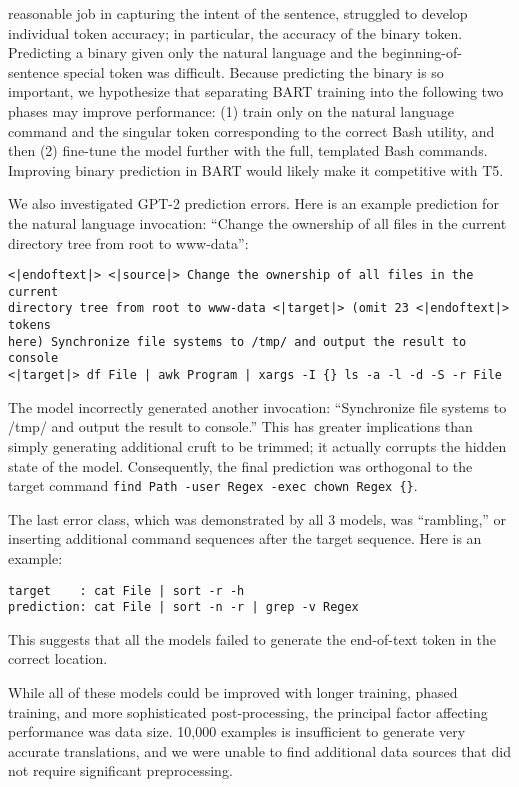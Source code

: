 reasonable job in capturing the intent of the sentence, struggled to develop
individual token accuracy; in particular, the accuracy of the binary token.
Predicting a binary given only the natural language and the
beginning-of-sentence special token was difficult. Because predicting the
binary is so important, we hypothesize that separating BART training into the
following two phases may improve performance: (1) train only on the natural
language command and the singular token corresponding to the correct Bash
utility, and then (2)
fine-tune the model further with the full, templated Bash commands. Improving
binary prediction in BART would likely make it competitive with T5.
\par
We also investigated GPT-2 prediction errors. Here is an example prediction for the natural language invocation: ``Change the ownership of all files in the current directory tree from root to www-data'':

\begin{verbatim}
<|endoftext|> <|source|> Change the ownership of all files in the current 
directory tree from root to www-data <|target|> (omit 23 <|endoftext|> tokens 
here) Synchronize file systems to /tmp/ and output the result to console 
<|target|> df File | awk Program | xargs -I {} ls -a -l -d -S -r File
\end{verbatim}
The model incorrectly generated another invocation: ``Synchronize file systems to /tmp/ and output the result to console.'' This has greater implications than simply generating additional cruft to be trimmed; it actually corrupts the hidden state of the model. Consequently, the final prediction was orthogonal to the target command \texttt{find Path -user Regex -exec chown Regex \{\}}.
\par
The last error class, which was demonstrated by all 3 models, was ``rambling,'' or inserting additional command sequences after the target sequence. Here is an example:
\begin{verbatim}
target    : cat File | sort -r -h 
prediction: cat File | sort -n -r | grep -v Regex
\end{verbatim}
This suggests that all the models failed to generate the end-of-text token in
the correct location.
\par
While all of these models could be improved with longer training, phased
training, and more sophisticated post-processing, the principal factor
affecting performance was data size. 10,000 examples is insufficient to
generate very accurate translations, and we were unable to find additional data
sources that did not require significant preprocessing.
